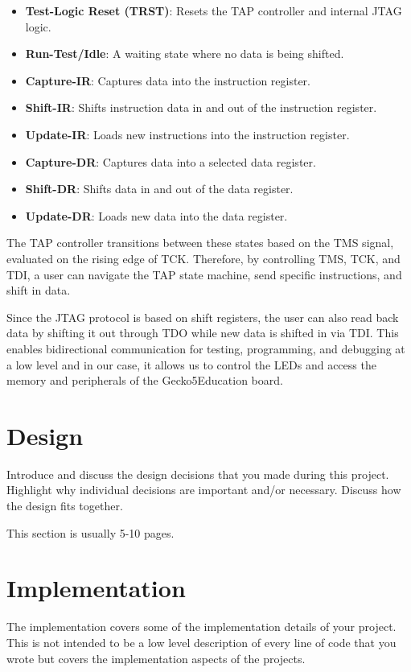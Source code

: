 \documentclass[a4paper,11pt,oneside]{report}
\newcommand{\boardName}{Gecko5Education \xspace}
\begin{document}
\begin{itemize}
\item \textbf{Test-Logic Reset (TRST)}: Resets the TAP controller and internal JTAG logic.
\item \textbf{Run-Test/Idle}: A waiting state where no data is being shifted.
\item \textbf{Capture-IR}: Captures data into the instruction register.
\item \textbf{Shift-IR}: Shifts instruction data in and out of the instruction register.
\item \textbf{Update-IR}: Loads new instructions into the instruction register.
\item \textbf{Capture-DR}: Captures data into a selected data register.
\item \textbf{Shift-DR}: Shifts data in and out of the data register.
\item \textbf{Update-DR}: Loads new data into the data register.
\end{itemize}

The TAP controller transitions between these states based on the TMS signal, evaluated on the rising edge of TCK. 
Therefore, by controlling TMS, TCK, and TDI, a user can navigate the TAP state machine, send specific instructions, and shift in data.

Since the JTAG protocol is based on shift registers, the user can also read back data by shifting it out through TDO while new data is shifted in via TDI. 
This enables bidirectional communication for testing, programming, and debugging at a low level and in our case, it allows us to control the LEDs and access the 
memory and peripherals of the \boardName board.
\chapter{Design}

Introduce and discuss the design decisions that you made during this project.
Highlight why individual decisions are important and/or necessary. Discuss
how the design fits together.

This section is usually 5-10 pages.


\chapter{Implementation}

The implementation covers some of the implementation details of your project.
This is not intended to be a low level description of every line of code that
you wrote but covers the implementation aspects of the projects.
\end{document}
